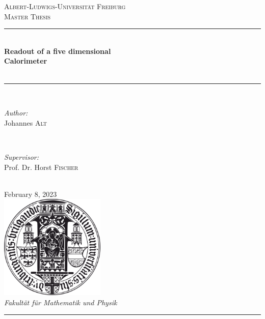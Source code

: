 \begin{titlepage}
\newcommand{\HRule}{\rule{\linewidth}{0.25mm}} %
\center
\textsc{\LARGE Albert-Ludwigs-Universit\"{a}t Freiburg}\\[1.5cm]
\textsc{\Large Master Thesis}\\[0.4cm]
\HRule \\[0.4cm]
{\huge \bfseries Readout of a five dimensional} \\[0.2cm] 
{\huge \bfseries Calorimeter} \\[0.2cm]
\\[0.2cm]
\HRule \\[1.5cm]

\begin{minipage}{0.4\textwidth}
\begin{flushleft} \large
\emph{Author:}\\
Johannes \textsc{Alt} \\
\end{flushleft}
\end{minipage}
~
\begin{minipage}{0.4\textwidth}
\begin{flushright} \large
\emph{Supervisor:} \\
Prof. Dr. Horst \textsc{Fischer} \\
\end{flushright}
\end{minipage}\\[2cm]

{\large February 8, 2023}\\[1cm]

\includegraphics[width=5cm, keepaspectratio]{pictures/siegel.png}\\[1cm]

\large \emph{Fakult\"{a}t f\"{u}r Mathematik und Physik}\\[0.4cm]

\HRule \\
\setcounter{page}{0}
\end{titlepage}
